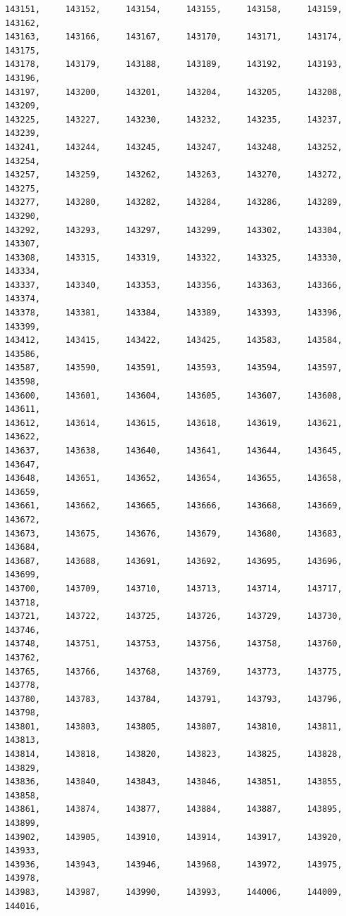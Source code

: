 \documentclass[a4paper,11pt]{report}
\begin{document}
\begin{verbatim}
143151,     143152,     143154,     143155,     143158,     143159,     143162,
143163,     143166,     143167,     143170,     143171,     143174,     143175,
143178,     143179,     143188,     143189,     143192,     143193,     143196,
143197,     143200,     143201,     143204,     143205,     143208,     143209,
143225,     143227,     143230,     143232,     143235,     143237,     143239,
143241,     143244,     143245,     143247,     143248,     143252,     143254,
143257,     143259,     143262,     143263,     143270,     143272,     143275,
143277,     143280,     143282,     143284,     143286,     143289,     143290,
143292,     143293,     143297,     143299,     143302,     143304,     143307,
143308,     143315,     143319,     143322,     143325,     143330,     143334,
143337,     143340,     143353,     143356,     143363,     143366,     143374,
143378,     143381,     143384,     143389,     143393,     143396,     143399,
143412,     143415,     143422,     143425,     143583,     143584,     143586,
143587,     143590,     143591,     143593,     143594,     143597,     143598,
143600,     143601,     143604,     143605,     143607,     143608,     143611,
143612,     143614,     143615,     143618,     143619,     143621,     143622,
143637,     143638,     143640,     143641,     143644,     143645,     143647,
143648,     143651,     143652,     143654,     143655,     143658,     143659,
143661,     143662,     143665,     143666,     143668,     143669,     143672,
143673,     143675,     143676,     143679,     143680,     143683,     143684,
143687,     143688,     143691,     143692,     143695,     143696,     143699,
143700,     143709,     143710,     143713,     143714,     143717,     143718,
143721,     143722,     143725,     143726,     143729,     143730,     143746,
143748,     143751,     143753,     143756,     143758,     143760,     143762,
143765,     143766,     143768,     143769,     143773,     143775,     143778,
143780,     143783,     143784,     143791,     143793,     143796,     143798,
143801,     143803,     143805,     143807,     143810,     143811,     143813,
143814,     143818,     143820,     143823,     143825,     143828,     143829,
143836,     143840,     143843,     143846,     143851,     143855,     143858,
143861,     143874,     143877,     143884,     143887,     143895,     143899,
143902,     143905,     143910,     143914,     143917,     143920,     143933,
143936,     143943,     143946,     143968,     143972,     143975,     143978,
143983,     143987,     143990,     143993,     144006,     144009,     144016,

\end{verbatim}
\end{document}
